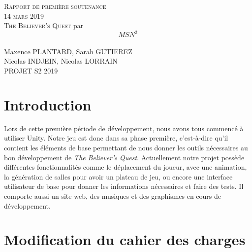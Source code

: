 \documentclass[]{extarticle}
\begin{document}
\begin{spacing}{1.25}

\textsc{ }\\
\textsc{ }\\
\textsc{ }\\
\textsc{ }\\
\textsc{ }\\

\begin{center}
\textsc{\LARGE Rapport de première soutenance} \\
\bigbreak
\textsc{\LARGE 14 mars 2019} \\
\bigbreak
\bigbreak
\bigbreak
\bigbreak
\bigbreak
\bigbreak
\bigbreak
\textsc{\Huge The Believer's Quest}
\bigbreak
\bigbreak
\bigbreak
\bigbreak
\bigbreak
\bigbreak
\bigbreak
\bigbreak
\bigbreak
par \\ 
\[MSN^{2}\]\\
Maxence PLANTARD, Sarah GUTIEREZ \\
Nicolas INDJEIN, Nicolas LORRAIN \\
\bigbreak
\bigbreak
\bigbreak
PROJET S2 2019
\end{center}
\newpage

\renewcommand{\contentsname}{Sommaire}
\tableofcontents
\newpage

\section{Introduction}
\bigbreak
\bigbreak

Lors de cette première période de développement, nous avons tous commencé à utiliser Unity. Notre jeu est donc dans sa phase première, c’est-à-dire qu’il contient les éléments de base permettant de nous donner les outils nécessaires au bon développement de \textit{The Believer’s Quest}. Actuellement notre projet possède différentes fonctionnalités comme le déplacement du joueur, avec une animation, la génération de salles pour avoir un plateau de jeu, ou encore une interface utilisateur de base pour donner les informations nécessaires et faire des tests. Il comporte aussi un site web, des musiques et des graphismes en cours de développement. 
\bigbreak
\bigbreak
\bigbreak
\bigbreak
\bigbreak
\bigbreak

\section{Modification du cahier des charges}


\end{spacing}
\end{document}
